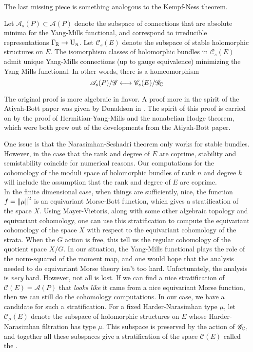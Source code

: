 %
The last missing piece is something analogous to the Kempf-Ness theorem.
%
\begin{thm}
Let $\mathscr{A}_s(P) \subset \mathscr{A}(P)$ denote the subspace of connections
that are absolute minima for the Yang-Mills functional, and correspond
to irreducible representations $\Gamma_{\mathbb{R}} \to \mathrm{U}_n$. Let $\mathscr{C}_s(E)$
denote the subspace of stable holomorphic structures on $E$. The isomorphism
classes of holomorphic bundles in $\mathscr{C}_s(E)$ admit unique
Yang-Mills connections (up to gauge equivalence) minimizing the Yang-Mills functional.
In other words, there is a homeomorphism
\[
\mathscr{A}_s(P)/\mathscr{G} \longleftrightarrow \mathscr{C}_s(E)/\mathscr{G}_{\mathbb{C}}
\]
\end{thm}
%
\begin{rem*}
The original proof is more algebraic in flavor. A proof more in the spirit
of the Atiyah-Bott paper was given by Donaldson in \cite{donaldson1983}.
The spirit of this proof is carried on by the proof of Hermitian-Yang-Mills
and the nonabelian Hodge theorem, which were both grew out of the
developments from the Atiyah-Bott paper.
\end{rem*}
%
One issue is that the Narasimhan-Seshadri theorem only works for
stable bundles. However, in the case that the rank and degree of $E$
are coprime, stability and semistability coincide for numerical reasons.
Our computations for the cohomology of the moduli space of holomorphic
bundles of rank $n$ and degree $k$ will include the assumption that the
rank and degree of $E$ are coprime. \\
%

In the finite dimensional case, when things are sufficiently, nice,
the function $f = \left\lVert\mu\right\rVert^2$ is an equivariant Morse-Bott function,
which gives a stratification of the space $X$. Using Mayer-Vietoris, along
with some other algebraic topology and equivariant cohomology, one can
use this stratification to compute the equivariant cohomology of
the space $X$ with respect to the equivariant cohomology of the strata.
When the $G$ action is free, this tell us the regular cohomology of
the quotient space $X/G$. In our situation, the Yang-Mills functional
plays the role of the norm-squared of the moment map, and one would hope
that the analysis needed to do equivariant Morse theory isn't too
hard. Unfortunately, the analysis is \emph{very} hard. However, not all is
lost. If we can find a nice stratification of $\mathscr{C}(E) = \mathscr{A}(P)$
that \emph{looks like} it came from a nice equivariant Morse function, then
we can still do the cohomology computations. In our case, we have a
candidate for such a stratification. For a fixed Harder-Narasimhan type
$\mu$, let $\mathscr{C}_\mu(E)$ denote the subspace of holomorphic
structures on $E$ whose Harder-Narasimhan filtration has type $\mu$.
This subspace is preserved by the action of $\mathscr{G}_{\mathbb{C}}$, and
together all these subspaces give a stratification of the space
$\mathscr{C}(E)$ called the .
%
